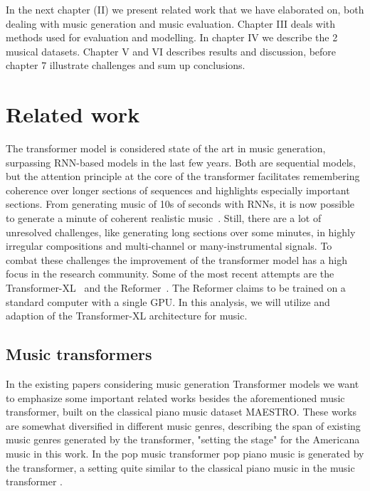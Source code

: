 \documentclass{IEEEtran}
\begin{document}
In the next chapter (II) we present related work that we have elaborated on, both
dealing with music generation and music evaluation. Chapter III deals with methods  
used for evaluation and modelling. In chapter IV we describe the 2 musical datasets.
Chapter V and VI describes results and discussion, before chapter 7 illustrate 
challenges and sum up conclusions.

\section{Related work}

The transformer model is considered state of the art
in music generation, surpassing RNN-based models in the last few years. Both
are sequential models, but the attention principle at the core of the
transformer facilitates remembering coherence over longer sections of
sequences and highlights especially important sections. From generating music
of 10s of seconds with RNNs, it is now possible to generate a minute of
coherent realistic music~\cite{huang2018music}. Still, there are a lot of
unresolved challenges, like generating long sections over some minutes, in
highly irregular compositions and multi-channel or many-instrumental signals.
To combat these challenges the improvement of the transformer model has a high
focus in the research community. Some of the most recent attempts are the
Transformer-XL~\cite{dai2019transformerxl} and the
Reformer~\cite{kitaev2020reformer}.
The Reformer claims to be trained on a standard computer with a single GPU.
In this analysis, we will utilize and adaption of the Transformer-XL
architecture for music.

\subsection{Music transformers}

In the existing papers considering music
generation Transformer models we want to emphasize some important related
works besides the aforementioned music transformer, built on the classical
piano music dataset MAESTRO. These works are somewhat diversified in
different music genres, describing the span of existing music genres
generated by the transformer, "setting the stage" for the Americana music in
this work. In the pop music transformer \cite{huang2020pop} pop piano music
is generated by the transformer, a setting quite similar to the classical
piano music in the music transformer \cite{huang2018music}.
\end{document}
